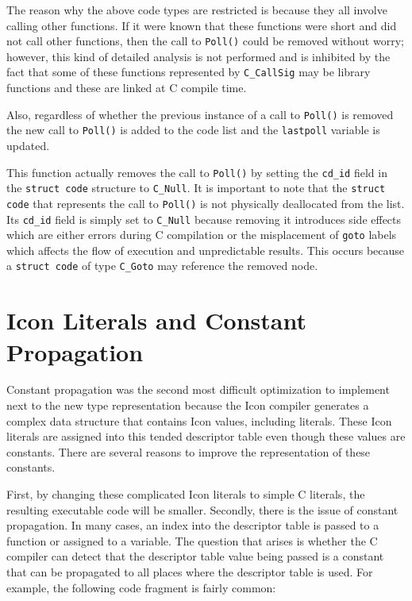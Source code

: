 The reason why the above code types are restricted is because they all
involve calling other functions. If it were known that these functions
were short and did not call other functions, then the call to
\texttt{Poll()} could be removed without worry; however, this kind of
detailed analysis is not performed and is inhibited by the fact that
some of these functions represented by \texttt{C\_CallSig} may be
library functions and these are linked at C compile time.

Also, regardless of whether the previous instance of a call to
\texttt{Poll()} is removed the new call to \texttt{Poll()} is added to
the code list and the \texttt{lastpoll} variable is updated.



This function actually removes the call to \texttt{Poll()} by setting
the \texttt{cd\_id} field in the \texttt{struct code} structure to
\texttt{C\_Null}. It is important to note that the \texttt{struct
code} that represents the call to \texttt{Poll()} is not physically
deallocated from the list. Its \texttt{cd\_id} field is simply set
to \texttt{C\_Null} because removing it introduces side effects which
are either errors during C compilation or the misplacement of
\texttt{goto} labels which affects the flow of execution and
unpredictable results. This occurs because a \texttt{struct code}
of type \texttt{C\_Goto} may reference the removed node.

\section{Icon Literals and Constant Propagation}

Constant propagation was the second most difficult optimization to
implement next to the new type representation because the Icon
compiler generates a complex data structure that contains Icon values,
including literals. These Icon literals are assigned into this tended
descriptor table even though these values are constants. There are
several reasons to improve the representation of these constants.

First, by changing these complicated Icon literals to simple C
literals, the resulting executable code will be smaller. Secondly,
there is the issue of constant propagation. In many cases, an index
into the descriptor table is passed to a function or assigned to a
variable. The question that arises is whether the C compiler can
detect that the descriptor table value being passed is a constant that
can be propagated to all places where the descriptor table is used.
For example, the following code fragment is fairly common:

